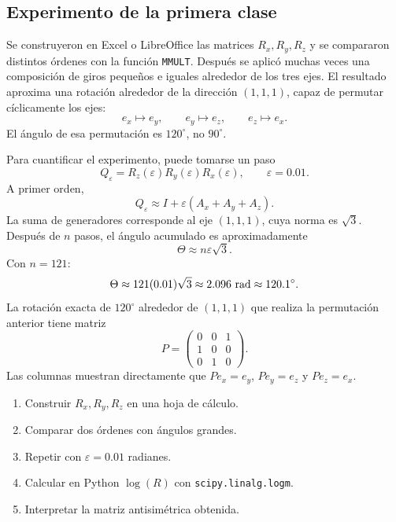 \subsection{Experimento de la primera clase}

Se construyeron en Excel o LibreOffice las matrices \(R_x,R_y,R_z\) y se compararon distintos
órdenes con la función \texttt{MMULT}. Después se aplicó muchas veces una composición de
giros pequeños e iguales alrededor de los tres ejes. El resultado aproxima una rotación
alrededor de la dirección \((1,1,1)\), capaz de permutar cíclicamente los ejes:
\[
  e_x\longmapsto e_y,\qquad
  e_y\longmapsto e_z,\qquad
  e_z\longmapsto e_x.
\]
El ángulo de esa permutación es \(120^\circ\), no \(90^\circ\).

Para cuantificar el experimento, puede tomarse un paso
\[
Q_\varepsilon
=R_z(\varepsilon)R_y(\varepsilon)R_x(\varepsilon),
\qquad \varepsilon=0.01.
\]
A primer orden,
\[
Q_\varepsilon
\approx I+\varepsilon(A_x+A_y+A_z).
\]
La suma de generadores corresponde al eje \((1,1,1)\), cuya norma es \(\sqrt3\). Después de
\(n\) pasos, el ángulo acumulado es aproximadamente
\[
  \Theta\approx n\varepsilon\sqrt3.
\]
Con \(n=121\):
\[
  \Theta\approx121(0.01)\sqrt3
  \approx2.096\ {\rm rad}
  \approx120.1^\circ.
\]
La rotación exacta de \(120^\circ\) alrededor de \((1,1,1)\) que realiza la permutación
anterior tiene matriz
\[
P=
\begin{pmatrix}
0&0&1\\
1&0&0\\
0&1&0
\end{pmatrix}.
\]
Las columnas muestran directamente que \(Pe_x=e_y\), \(Pe_y=e_z\) y \(Pe_z=e_x\).

\begin{idea}
\begin{enumerate}
  \item Construir \(R_x,R_y,R_z\) en una hoja de cálculo.
  \item Comparar dos órdenes con ángulos grandes.
  \item Repetir con \(\varepsilon=0.01\) radianes.
  \item Calcular en Python \(\log(R)\) con \texttt{scipy.linalg.logm}.
  \item Interpretar la matriz antisimétrica obtenida.
\end{enumerate}
\end{idea}

